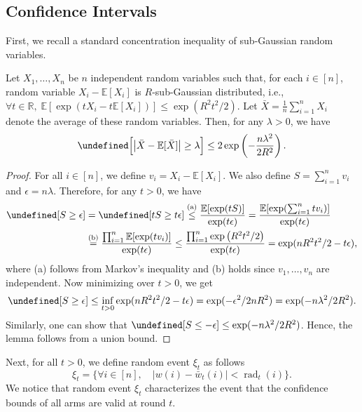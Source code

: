 \documentclass{article}
\newcommand{\E}{\mathbb E}
\newcommand{\RR}{\mathbb R}
\DeclareMathOperator{\rad}{rad}
\let\Pr\undefined
\DeclareMathOperator{\Pr}{Pr}
\begin{document}
\subsection{Confidence Intervals}

First, we recall a standard concentration inequality of sub-Gaussian random variables.
\begin{lemma}
\label{lemma:hoeffeding}
Let $X_1,\ldots, X_n$ be $n$ independent random variables such that, for each $i\in[n]$, random variable $X_i-\E[X_i]$ is $R$-sub-Gaussian distributed, i.e., $\forall t\in \RR,\; \E[\exp(tX_i-t\E[X_i])] \le \exp(R^2t^2/2)$.
Let $\bar X=\frac{1}{n}\sum_{i=1}^n X_i$ denote the average of these random variables.
Then, for any $\lambda>0$, we have
$$
\Pr\Big[ \big|\bar X - \mathbb E[\bar X] \big| \ge \lambda \Big] \le 
2\exp\left(-\frac{n\lambda^2}{2R^2}\right).
$$
\end{lemma}

\begin{proof}
For all $i \in[n]$, we define $v_i = X_i-\E[X_i]$.
We also define $S = \sum_{i=1}^n v_i$ and $\epsilon = n\lambda$.
Therefore, for any $t >0$, we have
\begin{align*}
\Pr[S \ge \epsilon] &= \Pr[t S \ge t\epsilon]  
	\stackrel{\text{(a)}}{\le} \frac{\E[\exp( t S )]}{\exp(t\epsilon)} 
	= \frac{\E[\exp(\sum_{i=1}^n tv_i)]}{\exp(t\epsilon)} \\
	&\stackrel{\text{(b)}}{=} \frac{\prod_{i=1}^n \E[\exp(tv_i)]}{\exp(t\epsilon)} 
	\le \frac{\prod_{i=1}^n \exp\left(R^2 t^2/2 \right)}{\exp(t\epsilon)}
	= \exp(nR^2 t^2/2-t\epsilon),
\end{align*}
where (a) follows from Markov's inequality and (b) holds since $v_1,\ldots,v_n$ are independent.
Now minimizing over $t>0$, we get
\begin{align*}
\Pr[S \ge \epsilon] \le \inf_{t>0} \exp(nR^2t^2/2-t\epsilon)  = \exp(-\epsilon^2 / 2nR^2) = \exp(-n\lambda^2/2R^2).
\end{align*}
Similarly, one can show that $\Pr[S \le -\epsilon] \le \exp(-n\lambda^2 / 2R^2)$.
Hence, the lemma follows from a union bound.
\end{proof}


Next, for all $t>0$, we define random event $\xi_t$ as follows
\begin{equation}
\xi_t = \Big\{
\forall i\in[n],\quad 
|w(i)-\bar w_t(i)| < \rad_t(i) 
\Big\}.
\label{eq:define-xi}
\end{equation}
We notice that random event $\xi_t$ characterizes the event that the confidence bounds of all arms are valid at round $t$.
\end{document}
